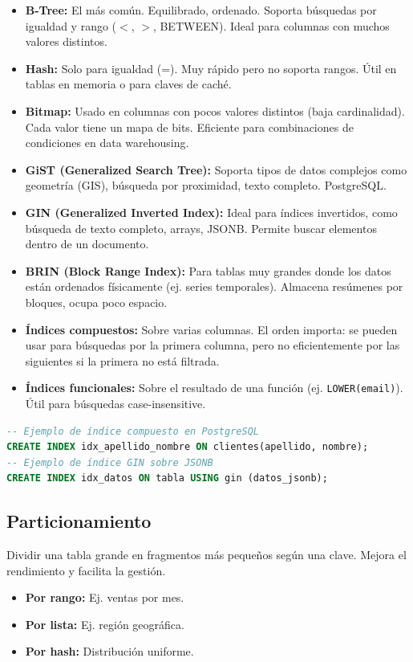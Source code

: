 \documentclass[12pt,a4paper,openany,oneside]{book}
\begin{document}
\begin{itemize}
    \item \textbf{B-Tree:} El más común. Equilibrado, ordenado. Soporta búsquedas por igualdad y rango ($<$, $>$, BETWEEN). Ideal para columnas con muchos valores distintos.
    \item \textbf{Hash:} Solo para igualdad (=). Muy rápido pero no soporta rangos. Útil en tablas en memoria o para claves de caché.
    \item \textbf{Bitmap:} Usado en columnas con pocos valores distintos (baja cardinalidad). Cada valor tiene un mapa de bits. Eficiente para combinaciones de condiciones en data warehousing.
    \item \textbf{GiST (Generalized Search Tree):} Soporta tipos de datos complejos como geometría (GIS), búsqueda por proximidad, texto completo. PostgreSQL.
    \item \textbf{GIN (Generalized Inverted Index):} Ideal para índices invertidos, como búsqueda de texto completo, arrays, JSONB. Permite buscar elementos dentro de un documento.
    \item \textbf{BRIN (Block Range Index):} Para tablas muy grandes donde los datos están ordenados físicamente (ej. series temporales). Almacena resúmenes por bloques, ocupa poco espacio.
    \item \textbf{Índices compuestos:} Sobre varias columnas. El orden importa: se pueden usar para búsquedas por la primera columna, pero no eficientemente por las siguientes si la primera no está filtrada.
    \item \textbf{Índices funcionales:} Sobre el resultado de una función (ej. \texttt{LOWER(email)}). Útil para búsquedas case-insensitive.
\end{itemize}
\begin{lstlisting}[language=SQL]
-- Ejemplo de índice compuesto en PostgreSQL
CREATE INDEX idx_apellido_nombre ON clientes(apellido, nombre);
-- Ejemplo de índice GIN sobre JSONB
CREATE INDEX idx_datos ON tabla USING gin (datos_jsonb);
\end{lstlisting}

\subsection{Particionamiento}
Dividir una tabla grande en fragmentos más pequeños según una clave. Mejora el rendimiento y facilita la gestión.
\begin{itemize}
    \item \textbf{Por rango:} Ej. ventas por mes.
    \item \textbf{Por lista:} Ej. región geográfica.
    \item \textbf{Por hash:} Distribución uniforme.
\end{itemize}
\end{document}
